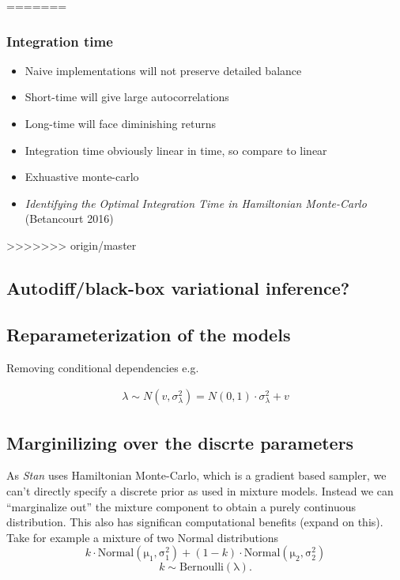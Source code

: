 \documentclass{report}
\begin{document}
=======
\subsubsection{Integration time}

\begin{itemize}
\item Naive implementations will not preserve detailed balance
\item Short-time will give large autocorrelations
\item Long-time will face diminishing returns
\item Integration time obviously linear in time, so compare to linear
\item Exhuastive monte-carlo
\item \emph{Identifying the Optimal Integration Time in Hamiltonian Monte-Carlo} (Betancourt 2016)
\end{itemize}

>>>>>>> origin/master
\subsection{Autodiff/black-box variational inference?}

\subsection{Reparameterization of the models}

Removing conditional dependencies e.g.

\begin{align*}
\lambda \sim N(v, \sigma^2_\lambda) = N(0, 1) \cdot \sigma_\lambda^2 + v
\end{align*}

\subsection{Marginilizing over the discrte parameters}

As \emph{Stan} uses Hamiltonian Monte-Carlo, which is a gradient based sampler, we can't directly specify a discrete prior as used in mixture models. Instead we can ``marginalize out'' the mixture component to obtain a purely continuous distribution. This also has significan computational benefits (expand on this). \\

Take for example a mixture of two Normal distributions
\begin{equation}
  k \cdot \operatorname{Normal(\mu_1, \sigma_1^2)} + (1 - k) \cdot \operatorname{Normal(\mu_2, \sigma_2^2)}
\end{equation} 
\begin{equation}
  k \sim \operatorname{Bernoulli(\lambda)}.
\end{equation}
\end{document}
